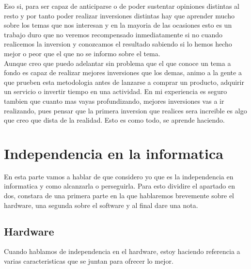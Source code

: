 Eso si, para ser capaz de anticiparse o de poder sustentar opiniones distintas al resto y por tanto poder realizar inversiones distintas hay que aprender mucho sobre los temas que nos interesan y en la mayoria de las ocasiones esto es un trabajo duro que no veremos recompensado inmediatamente si no cuando realicemos la inversion y conozcamos el resultado sabiendo si lo hemos hecho mejor o peor que el que no se informo sobre el tema.\\

Aunque creo que puedo adelantar sin problema que el que conoce un tema a fondo es capaz de realizar mejores inversiones que los demas, animo a la gente a que prueben esta metodologia antes de lanzarse a comprar un producto, adquirir un servicio o invertir tiempo en una actividad. En mi experiencia es seguro tambien que cuanto mas vayas profundizando, mejores inversiones vas a ir realizando, pues pensar que la primera inversion que realices sera increible es algo que creo que dista de la realidad. Esto es como todo, se aprende haciendo.

\section{Independencia en la informatica}

En esta parte vamos a hablar de que considero yo que es la independencia en informatica y como alcanzarla o perseguirla. Para esto dividire el apartado en dos, constara de una primera parte en la que hablaremos brevemente sobre el hardware, una segunda sobre el software y al final dare una nota.

\subsection{ Hardware }

Cuando hablamos de independencia en el hardware, estoy haciendo referencia a varias caracteristicas que se juntan para ofrecer lo mejor. 

